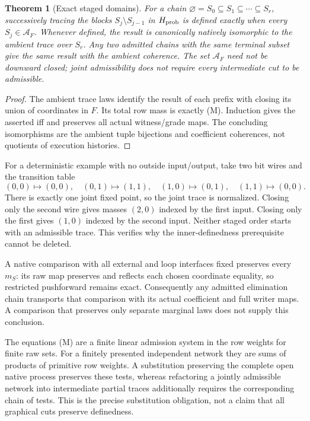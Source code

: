 \documentclass[11pt]{article}
\newtheorem{theorem}{Theorem}\newtheorem{proposition}[theorem]{Proposition}\newtheorem{lemma}[theorem]{Lemma}
\begin{document}
\begin{theorem}[Exact staged domains]
For a chain $\varnothing=S_0\subseteq S_1\subseteq\cdots\subseteq S_r$, successively tracing the blocks $S_j\setminus S_{j-1}$ in $H_{\rm prob}$ is defined exactly when every $S_j\in\mathcal A_F$. Whenever defined, the result is canonically natively isomorphic to the ambient trace over $S_r$. Any two admitted chains with the same terminal subset give the same result with the ambient coherence. The set $\mathcal A_F$ need not be downward closed; joint admissibility does not require every intermediate cut to be admissible.
\end{theorem}
\begin{proof}
The ambient trace laws identify the result of each prefix with closing its union of coordinates in $F$. Its total row mass is exactly (M). Induction gives the asserted iff and preserves all actual witness/grade maps. The concluding isomorphisms are the ambient tuple bijections and coefficient coherences, not quotients of execution histories.
\end{proof}

For a deterministic example with no outside input/output, take two bit wires and the transition table
\[
 (0,0)\mapsto(0,0),\quad(0,1)\mapsto(1,1),\quad
 (1,0)\mapsto(0,1),\quad(1,1)\mapsto(0,0).
\]
There is exactly one joint fixed point, so the joint trace is normalized. Closing only the second wire gives masses $(2,0)$ indexed by the first input. Closing only the first gives $(1,0)$ indexed by the second input. Neither staged order starts with an admissible trace. This verifies why the inner-definedness prerequisite cannot be deleted.

A native comparison with all external and loop interfaces fixed preserves every $m_S$: its raw map preserves and reflects each chosen coordinate equality, so restricted pushforward remains exact. Consequently any admitted elimination chain transports that comparison with its actual coefficient and full writer maps. A comparison that preserves only separate marginal laws does not supply this conclusion.

The equations (M) are a finite linear admission system in the row weights for finite raw sets. For a finitely presented independent network they are sums of products of primitive row weights. A substitution preserving the complete open native process preserves these tests, whereas refactoring a jointly admissible network into intermediate partial traces additionally requires the corresponding chain of tests. This is the precise substitution obligation, not a claim that all graphical cuts preserve definedness.
\end{document}
